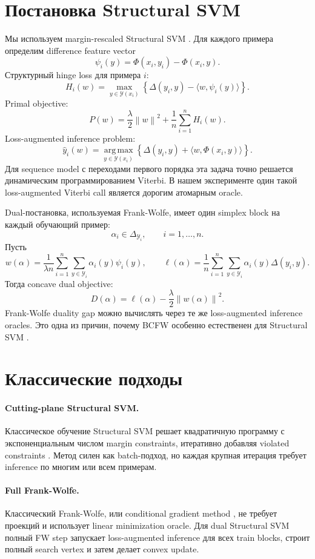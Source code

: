 \documentclass[11pt,a4paper]{article}
\newcommand{\Y}{\mathcal{Y}}
\newcommand{\argmax}{\operatorname*{arg\,max}}
\newcommand{\norm}[1]{\left\lVert #1 \right\rVert}
\begin{document}
\section{Постановка Structural SVM}

Мы используем margin-rescaled Structural SVM \citep{tsochantaridis2005large,joachims2009cutting}. Для каждого примера определим difference feature vector
\[
  \psi_i(y) = \Phi(x_i,y_i)-\Phi(x_i,y).
\]
Структурный hinge loss для примера \(i\):
\[
  H_i(w) = \max_{y\in\Y(x_i)}
    \left\{
      \Delta(y_i,y) - \langle w,\psi_i(y)\rangle
    \right\}.
\]
Primal objective:
\[
  P(w) =
  \frac{\lambda}{2}\norm{w}^2 +
  \frac{1}{n}\sum_{i=1}^{n} H_i(w).
\]
Loss-augmented inference problem:
\[
  \hat y_i(w) =
  \argmax_{y\in\Y(x_i)}
    \left\{
      \Delta(y_i,y) + \langle w,\Phi(x_i,y)\rangle
    \right\}.
\]
Для sequence model с переходами первого порядка эта задача точно решается динамическим программированием Viterbi. В нашем эксперименте один такой loss-augmented Viterbi call является дорогим атомарным oracle.

Dual-постановка, используемая Frank-Wolfe, имеет один simplex block на каждый обучающий пример:
\[
  \alpha_i \in \Delta_{\Y_i}, \qquad i=1,\ldots,n.
\]
Пусть
\[
  w(\alpha) =
  \frac{1}{\lambda n}
  \sum_{i=1}^{n}\sum_{y\in\Y_i}\alpha_i(y)\psi_i(y),
  \qquad
  \ell(\alpha) =
  \frac{1}{n}
  \sum_{i=1}^{n}\sum_{y\in\Y_i}\alpha_i(y)\Delta(y_i,y).
\]
Тогда concave dual objective:
\[
  D(\alpha) =
  \ell(\alpha) -
  \frac{\lambda}{2}\norm{w(\alpha)}^2.
\]
Frank-Wolfe duality gap можно вычислять через те же loss-augmented inference oracles. Это одна из причин, почему BCFW особенно естественен для Structural SVM \citep{lacostejulien2013bcfw}.

\section{Классические подходы}

\paragraph{Cutting-plane Structural SVM.}
Классическое обучение Structural SVM решает квадратичную программу с экспоненциальным числом margin constraints, итеративно добавляя violated constraints \citep{tsochantaridis2005large,joachims2009cutting}. Метод силен как batch-подход, но каждая крупная итерация требует inference по многим или всем примерам.

\paragraph{Full Frank-Wolfe.}
Классический Frank-Wolfe, или conditional gradient method \citep{frank1956algorithm,jaggi2013frankwolfe}, не требует проекций и использует linear minimization oracle. Для dual Structural SVM полный FW step запускает loss-augmented inference для всех train blocks, строит полный search vertex и затем делает convex update.
\end{document}
